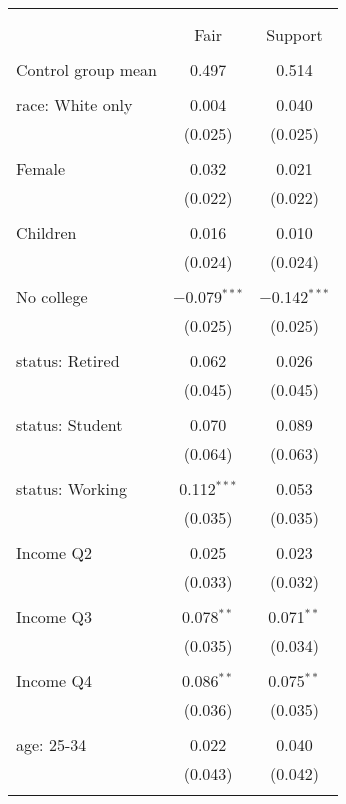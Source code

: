 
\begin{tabular}{@{\extracolsep{5pt}}lcc} 
\\[-1.8ex]\hline 
\hline \\[-1.8ex] 
\\[-1.8ex] & Fair & Support \\ 
\hline \\[-1.8ex] 
 Control group mean & 0.497 & 0.514  \\ \hline \\[-1.8ex] race: White only & 0.004 & 0.040 \\ 
  & (0.025) & (0.025) \\ 
  & & \\ 
 Female & 0.032 & 0.021 \\ 
  & (0.022) & (0.022) \\ 
  & & \\ 
 Children & 0.016 & 0.010 \\ 
  & (0.024) & (0.024) \\ 
  & & \\ 
 No college & $-$0.079$^{***}$ & $-$0.142$^{***}$ \\ 
  & (0.025) & (0.025) \\ 
  & & \\ 
 status: Retired & 0.062 & 0.026 \\ 
  & (0.045) & (0.045) \\ 
  & & \\ 
 status: Student & 0.070 & 0.089 \\ 
  & (0.064) & (0.063) \\ 
  & & \\ 
 status: Working & 0.112$^{***}$ & 0.053 \\ 
  & (0.035) & (0.035) \\ 
  & & \\ 
 Income Q2 & 0.025 & 0.023 \\ 
  & (0.033) & (0.032) \\ 
  & & \\ 
 Income Q3 & 0.078$^{**}$ & 0.071$^{**}$ \\ 
  & (0.035) & (0.034) \\ 
  & & \\ 
 Income Q4 & 0.086$^{**}$ & 0.075$^{**}$ \\ 
  & (0.036) & (0.035) \\ 
  & & \\ 
 age: 25-34 & 0.022 & 0.040 \\ 
  & (0.043) & (0.042) \\ 
  & & \\ 

\end{tabular}
